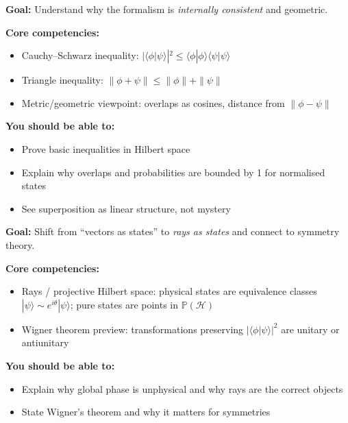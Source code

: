 \documentclass[11pt,a4paper]{article}
\begin{document}
\medskip
\begin{tcolorbox}[tierbox=tier3col, title={Tier 3 --- Advanced Undergraduate (AdvUG)\ \ \normalfont\small[\textcolor{ugblue}{Undergraduate track}]}]
\textbf{Goal:} Understand why the formalism is \emph{internally consistent} and geometric.

\medskip\noindent\textbf{Core competencies:}
\begin{itemize}[leftmargin=1.5em,itemsep=2pt]
  \item Cauchy--Schwarz inequality:
        $|\langle\phi|\psi\rangle|^2\le\langle\phi|\phi\rangle\langle\psi|\psi\rangle$
  \item Triangle inequality: $\|\phi+\psi\|\le\|\phi\|+\|\psi\|$
  \item Metric/geometric viewpoint: overlaps as cosines, distance from $\|\phi-\psi\|$
\end{itemize}

\medskip\noindent\textbf{You should be able to:}
\begin{itemize}[leftmargin=1.5em,itemsep=2pt]
  \item Prove basic inequalities in Hilbert space
  \item Explain why overlaps and probabilities are bounded by 1 for normalised states
  \item See superposition as linear structure, not mystery
\end{itemize}
\end{tcolorbox}

\medskip
\begin{tcolorbox}[tierbox=tier4col, title={Tier 4 --- Master's (MSc)\ \ \normalfont\small[\textcolor{gradred}{Graduate track}]}]
\textbf{Goal:} Shift from ``vectors as states'' to \emph{rays as states} and connect
to symmetry theory.

\medskip\noindent\textbf{Core competencies:}
\begin{itemize}[leftmargin=1.5em,itemsep=2pt]
  \item Rays / projective Hilbert space: physical states are equivalence classes
        $|\psi\rangle\sim e^{i\theta}|\psi\rangle$; pure states are points in
        $\mathbb{P}(\mathcal{H})$
  \item Wigner theorem preview: transformations preserving
        $|\langle\phi|\psi\rangle|^2$ are unitary or antiunitary
\end{itemize}

\medskip\noindent\textbf{You should be able to:}
\begin{itemize}[leftmargin=1.5em,itemsep=2pt]
  \item Explain why global phase is unphysical and why rays are the correct objects
  \item State Wigner's theorem and why it matters for symmetries
\end{itemize}
\end{tcolorbox}
\end{document}
